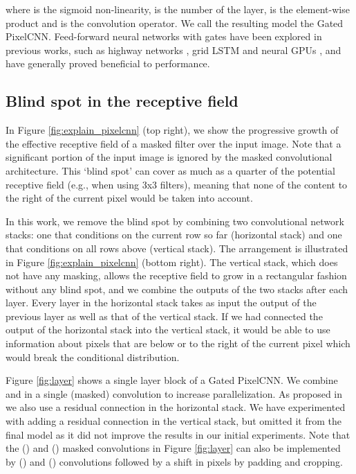 \documentclass{article}
\begin{document}
where  is the sigmoid non-linearity,  is the number of the layer,  is the element-wise product and  is the convolution operator. We call the resulting model the Gated PixelCNN.
Feed-forward neural networks with gates have been explored in previous works, such as highway networks \cite{srivastava2015training}, grid LSTM \cite{DBLP:journals/corr/KalchbrennerDG15} and neural GPUs \cite{kaiser2015neural}, and have generally proved beneficial to performance. 

\subsection{Blind spot in the receptive field}

In Figure \ref{fig:explain_pixelcnn} (top right), we show the progressive growth of the effective receptive field of a  masked filter over the input image. Note that a significant portion of the input image is ignored by the masked convolutional architecture. This `blind spot' can cover as much as a quarter of the potential receptive field (e.g., when using 3x3 filters), meaning that none of the content to the right of the current pixel would be taken into account. 

In this work, we remove the blind spot by combining two convolutional network stacks: one that conditions on the current row so far (horizontal stack) and one that conditions on all rows above (vertical stack). The arrangement is illustrated in Figure \ref{fig:explain_pixelcnn} (bottom right). The vertical stack, which does not have any masking, allows the receptive field to grow in a rectangular fashion without any blind spot, and we combine the outputs of the two stacks after each layer. Every layer in the horizontal stack takes as input the output of the previous layer as well as that of the vertical stack. If we had connected the output of the horizontal stack into the vertical stack, it would be able to use information about pixels that are below or to the right of the current pixel which would break the conditional distribution.

Figure \ref{fig:layer} shows a single layer block of a Gated PixelCNN. We combine  and  in a single (masked) convolution to increase parallelization. As proposed in \cite{van2016pixel} we also use a residual connection \cite{resnets} in the horizontal stack. We have  experimented with adding a residual connection in the vertical stack, but omitted it from the final model as it did not improve the results in our initial experiments. Note that the () and () masked convolutions in Figure \ref{fig:layer} can also be implemented by () and () convolutions followed by a shift in pixels by padding and cropping.
\end{document}
